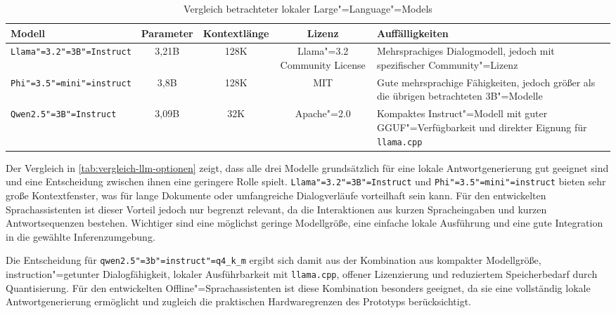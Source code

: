 \begin{table}[H]
  \caption{Vergleich betrachteter lokaler Large"=Language"=Models}
  \label{tab:vergleich-llm-optionen}
  \centering
  \setlength{\tabcolsep}{6pt}
  \begin{tabularx}{\textwidth}{L c c C L}
    \toprule
    \textbf{Modell}                   & \textbf{Parameter} & \textbf{Kontextlänge} & \textbf{Lizenz}              & \textbf{Auffälligkeiten}                                                                             \\
    \midrule
    \texttt{Llama"=3.2"=3B"=Instruct} & 3,21B              & 128K                  & Llama"=3.2 Community License & Mehrsprachiges Dialogmodell, jedoch mit spezifischer Community"=Lizenz                               \\
    \texttt{Phi"=3.5"=mini"=instruct} & 3,8B               & 128K                  & MIT                          & Gute mehrsprachige Fähigkeiten, jedoch größer als die übrigen betrachteten 3B"=Modelle               \\
    \texttt{Qwen2.5"=3B"=Instruct}    & 3,09B              & 32K                   & Apache"=2.0                  & Kompaktes Instruct"=Modell mit guter GGUF"=Verfügbarkeit und direkter Eignung für \texttt{llama.cpp} \\
    \bottomrule
  \end{tabularx}
\end{table}

Der Vergleich in \autoref{tab:vergleich-llm-optionen} zeigt, dass alle drei Modelle grundsätzlich für eine lokale Antwortgenerierung gut geeignet sind und eine Entscheidung zwischen ihnen eine geringere Rolle spielt. \texttt{Llama"=3.2"=3B"=Instruct} und \texttt{Phi"=3.5"=mini"=instruct} bieten sehr große Kontextfenster, was für lange Dokumente oder umfangreiche Dialogverläufe vorteilhaft sein kann. Für den entwickelten Sprachassistenten ist dieser Vorteil jedoch nur begrenzt relevant, da die Interaktionen aus kurzen Spracheingaben und kurzen Antwortsequenzen bestehen. Wichtiger sind eine möglichst geringe Modellgröße, eine einfache lokale Ausführung und eine gute Integration in die gewählte Inferenzumgebung.

Die Entscheidung für \texttt{qwen2.5"=3b"=instruct"=q4\_k\_m} ergibt sich damit aus der Kombination aus kompakter Modellgröße, instruction"=getunter Dialogfähigkeit, lokaler Ausführbarkeit mit \texttt{llama.cpp}, offener Lizenzierung und reduziertem Speicherbedarf durch Quantisierung. Für den entwickelten Offline"=Sprachassistenten ist diese Kombination besonders geeignet, da sie eine vollständig lokale Antwortgenerierung ermöglicht und zugleich die praktischen Hardwaregrenzen des Prototyps berücksichtigt.


